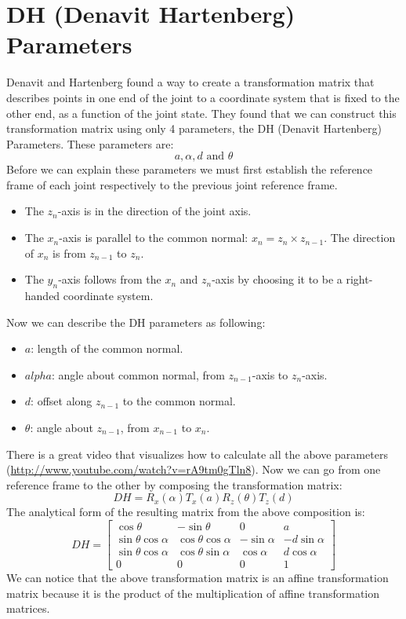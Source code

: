 \section{DH (Denavit \- Hartenberg) Parameters}
Denavit and Hartenberg found a way to create a transformation matrix that describes points in one end of the joint to a coordinate system that is fixed to the other end, as a function of the joint state. They found that we can construct this transformation matrix using only 4 parameters, the DH (Denavit \- Hartenberg) Parameters. These parameters are: 
\[a,\alpha,d \text{ and } \theta\]
Before we can explain these parameters we must first establish the reference frame of each joint respectively to the previous joint reference frame.
\begin{itemize}
\item The \(z_n\)-axis is in the direction of the joint axis. 
\item The \(x_n\)-axis is parallel to the common normal: \(x_n = z_n \times z_{n-1}\). The direction of \(x_n\) is from \(z_{n - 1}\) to \(z_n\).
\item The \(y_n\)-axis follows from the \(x_n\)  and \(z_n\)-axis by choosing it to be a right-handed coordinate system.
\end{itemize}
Now we can describe the DH parameters as following:
\begin{itemize}
\item\(a\): length of the common normal.
\item\(alpha\): angle about common normal, from \(z_{n-1}\)-axis to \(z_n\)-axis.
\item\(d\): offset along \(z_{n-1}\) to the common normal.
\item\(\theta\): angle about \(z_{n-1}\), from \(x_{n-1}\) to \(x_n\).
\end{itemize}
There is a great video that visualizes how to calculate all the above parameters (\url{http://www.youtube.com/watch?v=rA9tm0gTln8}).
Now we can go from one reference frame to the other by composing the transformation matrix:
\[DH = R_x(\alpha)T_x(a)R_z(\theta)T_z(d)\]
The analytical form of the resulting matrix from the above composition is:
\[
DH = 
\begin{bmatrix}
\cos\theta & -\sin\theta & 0 & a\\
\sin\theta\cos\alpha & \cos\theta\cos\alpha & -\sin\alpha & -d\sin\alpha\\
\sin\theta\cos\alpha & \cos\theta\sin\alpha & \cos\alpha & d\cos\alpha\\
0 & 0 & 0 & 1
\end{bmatrix}
\]
We can notice that the above transformation matrix is an affine transformation matrix because it is the product of the multiplication of affine transformation matrices.


